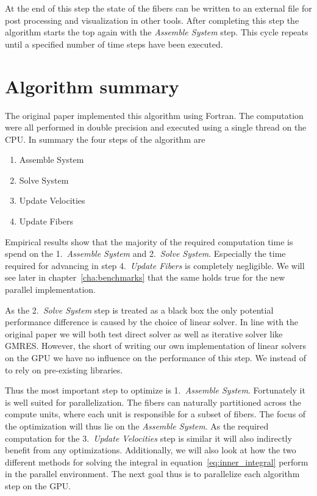 \documentclass[a4paper,11pt]{kth-mag}
\begin{document}
At the end of this step the state of the fibers can be written to an external file for post processing and visualization in other tools. After completing this step the algorithm starts the top again with the \emph{Assemble System} step. This cycle repeats until a specified number of time steps have been executed.

\section{Algorithm summary}
\label{sec:algorithm_summary}

The original paper implemented this algorithm using Fortran. The computation were all performed in double precision and executed using a single thread on the CPU. In summary the four steps of the algorithm are
\begin{enumerate}
  \item Assemble System
  \item Solve System
  \item Update Velocities
  \item Update Fibers
\end{enumerate}

Empirical results show that the majority of the required computation time is spend on the 1.~\emph{Assemble System} and 2.~\emph{Solve System}. Especially the time required for advancing in step 4.~\emph{Update Fibers} is completely negligible. We will see later in chapter~\ref{cha:benchmarks} that the same holds true for the new parallel implementation.

As the 2.~\emph{Solve System} step is treated as a black box the only potential performance difference is caused by the choice of linear solver. In line with the original paper we will both test direct solver as well as iterative solver like GMRES. However, the short of writing our own implementation of linear solvers on the GPU we have no influence on the performance of this step. We instead of to rely on pre-existing libraries.

Thus the most important step to optimize is 1.~\emph{Assemble System}. Fortunately it is well suited for parallelization. The fibers can naturally partitioned across the compute units, where each unit is responsible for a subset of fibers. The focus of the optimization will thus lie on the \emph{Assemble System}. As the required computation for the 3.~\emph{Update Velocities} step is similar it will also indirectly benefit from any optimizations. Additionally, we will also look at how the two different methods for solving the integral in equation~\ref{eq:inner_integral} perform in the parallel environment. The next goal thus is to parallelize each algorithm step on the GPU.
\end{document}
